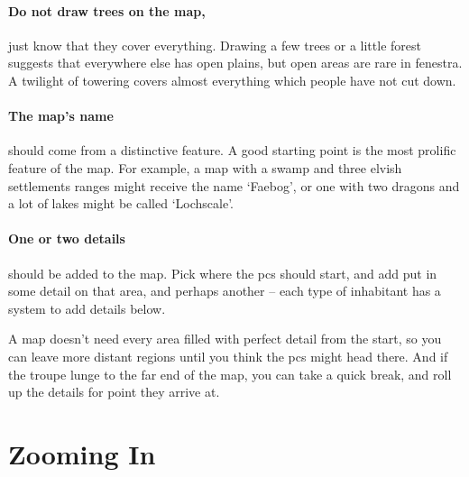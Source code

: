 \begin{multicols}{2}
\bigLine

\paragraph{Do not draw trees on the map,}
just know that they cover everything.
Drawing a few trees or a little forest suggests that everywhere else has open plains, but open areas are rare in \gls{fenestra}.
A twilight of towering covers almost everything which people have not cut down.

\paragraph{The map's name}
should come from a distinctive feature.
A good starting point is the most prolific feature of the map.
For example, a map with a swamp and three elvish settlements ranges might receive the name `Faebog', or one with two dragons and a lot of lakes might be called `Lochscale'.

\paragraph{One or two details}
should be added to the map.
Pick where the \glspl{pc} should start, and add put in some detail on that area, and perhaps another -- each type of inhabitant has a system to add details below.

A map doesn't need every area filled with perfect detail from the start, so you can leave more distant regions until you think the \glspl{pc} might head there.
And if the troupe lunge to the far end of the map, you can take a quick break, and roll up the details for point they arrive at.

\end{multicols}

\section{Zooming In}
\label{mapCharacter}

